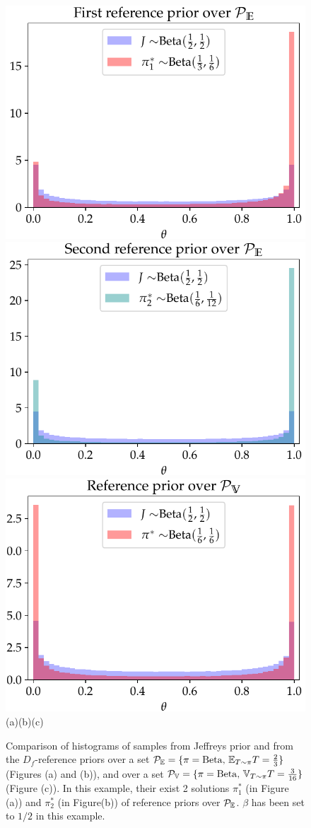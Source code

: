 \begin{figure}
    \centering%
    \includegraphics[width=0.32\linewidth]{figures/generalized-ref/firstPe.pdf}\hspace*{0.01\linewidth}%
    \includegraphics[width=0.32\linewidth]{figures/generalized-ref/secondPe.pdf}\hspace*{0.01\linewidth}%
    \includegraphics[width=0.32\linewidth]{figures/generalized-ref/Pv.pdf}\\
    {(a)(b)(c)\ }%
    \caption{Comparison of histograms of samples from Jeffreys prior and from the $D_f$-reference priors over a set $\mathcal{P}_{\mathbb{E}}=\{\pi=\mathrm{Beta},\,\mathbb{E}_{T\sim\pi}T=\frac{2}{3}\}$ (Figures (a) and (b)), and over a set $\mathcal{P}_{\mathbb{V}}=\{\pi=\mathrm{Beta},\,\mathbb{V}_{T\sim\pi}T=\frac{3}{16}\}$ (Figure (c)). In this example, their exist 2 solutions $\pi_1^\ast$ (in Figure (a)) and $\pi_2^\ast$ (in Figure(b)) of reference priors over $\mathcal{P}_{\mathbb{E}}$. $\beta$ has been set to $1/2$ in this example.}
    \label{fig:exbeta}
\end{figure}





